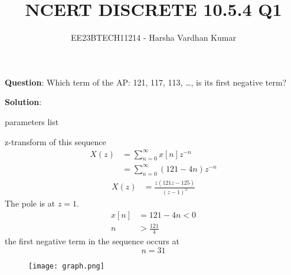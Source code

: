 \documentclass[journal,12pt,twocolumn]{IEEEtran}
\title{NCERT DISCRETE 10.5.4 Q1}
\author{EE23BTECH11214 - Harsha Vardhan Kumar}
\begin{document}
\maketitle

\noindent \textbf{Question}:
Which term of the AP: 121, 117, 113, \ldots, is its first negative term?

\textbf{Solution}:
\begin{table}[htbp]
\centering

\caption{parameters list}
\end{table}

z-transform of this sequence
\begin{align}
X(z) &= \sum_{n=0}^{\infty} x[n]z^{-n} \\
&= \sum_{n=0}^{\infty} (121 - 4n)z^{-n}
\end{align}
\begin{align}
    X(z) &= \frac{z(121z - 125)}{(z - 1)^2}
\end{align}
The pole is at \( z = 1 \).
\begin{align}
x[n] &= 121 - 4n < 0 \\
n &> \frac{121}{4} 
\end{align}
the first negative term in the sequence occurs at 
\[ n = 31 \]
\pagebreak
\begin{figure}[!ht] 
\centering
\texttt{[image: graph.png]}
\label{fig:Graph1}
\end{figure}
\end{document}
